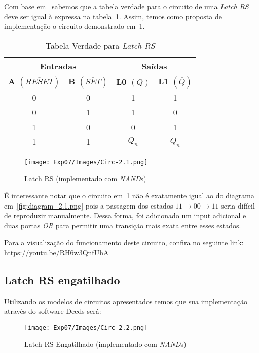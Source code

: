 \documentclass[12pt]{article}
\begin{document}
Com base em~\cite{cl_latchs_RS_D} sabemos que a tabela verdade para o circuito
de uma \emph{Latch RS} deve ser igual à expressa na
tabela~\ref{tab:truth_table_latch_rs}. Assim, temos como proposta de
implementação o circuito demonstrado em~\ref{fig:Circ-2.1.png}.

\begin{table}[H]
    \centering
    \caption{Tabela Verdade para \emph{Latch RS}}
    \begin{tabular}{|c|c||c|c|}\hline
      \multicolumn{2}{|c||}{Entradas} & \multicolumn{2}{|c|}{Saídas} \\\hline
      \textbf{A $(\overline{RESET})$} & \textbf{B $(\overline{SET})$} & \textbf{L0 $(Q)$} & \textbf{L1 $(\overline{Q})$} \\\hline
      0 & 0 & 1 & 1 \\\hline
      0 & 1 & 1 & 0 \\\hline
      1 & 0 & 0 & 1 \\\hline
      1 & 1 & $Q_{n}$ & $\overline{Q_{n}}$ \\\hline
    \end{tabular}\label{tab:truth_table_latch_rs}
\end{table}

\begin{figure}[H]
  \centering
  \texttt{[image: Exp07/Images/Circ-2.1.png]}
  \caption{Latch RS (implementado com \emph{NAND}s)}\label{fig:Circ-2.1.png}
\end{figure}

É interessante notar que o circuito em~\ref{fig:Circ-2.1.png} não é exatamente
igual ao do diagrama em~\ref{fig:diagram_2.1.png} pois a passagem dos estados
$11 \rightarrow 00 \rightarrow 11$ seria difícil de reproduzir manualmente.
Dessa forma, foi adicionado um input adicional e duas portas \emph{OR} para
permitir uma transição mais exata entre esses estados.

Para a visualização do funcionamento deste circuito, confira no seguinte link:
\href{https://youtu.be/RH6w3QnfUhA}{https://youtu.be/RH6w3QnfUhA}

\subsection{Latch RS engatilhado}\label{sec:2.2}

Utilizando os modelos de circuitos apresentados temos que sua implementação
através do software Deeds será:

\begin{figure}[H]
  \centering
  \texttt{[image: Exp07/Images/Circ-2.2.png]}
  \caption{Latch RS Engatilhado (implementado com \emph{NAND}s)}\label{fig:LatchRS-Engatilhado.png}
\end{figure}
\end{document}
